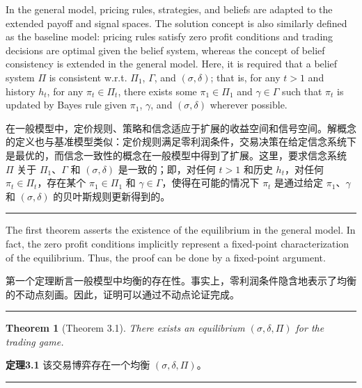 \documentclass[12pt,a4paper]{article}
\newenvironment{original}{%
  \par\vspace{4pt}\noindent%
  \color{black}%
  \ignorespaces
}{%
  \par\vspace{2pt}%
}
\newenvironment{translation}{%
  \par\vspace{2pt}\noindent%
  \color{transblue}%
  \ignorespaces
}{%
  \par\vspace{4pt}\hrule\vspace{6pt}%
}
\newtheorem{theorem}{Theorem}[section]
\begin{document}
\begin{original}
In the general model, pricing rules, strategies, and beliefs are adapted to the extended payoff and signal spaces. The solution concept is also similarly defined as the baseline model: pricing rules satisfy zero profit conditions and trading decisions are optimal given the belief system, whereas the concept of belief consistency is extended in the general model. Here, it is required that a belief system $\Pi$ is consistent w.r.t. $\Pi_1$, $\Gamma$, and $(\sigma, \delta)$; that is, for any $t > 1$ and history $h_t$, for any $\pi_t \in \Pi_t$, there exists some $\pi_1 \in \Pi_1$ and $\gamma \in \Gamma$ such that $\pi_t$ is updated by Bayes rule given $\pi_1$, $\gamma$, and $(\sigma, \delta)$ wherever possible.
\end{original}
\begin{translation}
在一般模型中，定价规则、策略和信念适应于扩展的收益空间和信号空间。解概念的定义也与基准模型类似：定价规则满足零利润条件，交易决策在给定信念系统下是最优的，而信念一致性的概念在一般模型中得到了扩展。这里，要求信念系统 $\Pi$ 关于 $\Pi_1$、$\Gamma$ 和 $(\sigma, \delta)$ 是一致的；即，对任何 $t > 1$ 和历史 $h_t$，对任何 $\pi_t \in \Pi_t$，存在某个 $\pi_1 \in \Pi_1$ 和 $\gamma \in \Gamma$，使得在可能的情况下 $\pi_t$ 是通过给定 $\pi_1$、$\gamma$ 和 $(\sigma, \delta)$ 的贝叶斯规则更新得到的。
\end{translation}

\begin{original}
The first theorem asserts the existence of the equilibrium in the general model. In fact, the zero profit conditions implicitly represent a fixed-point characterization of the equilibrium. Thus, the proof can be done by a fixed-point argument.
\end{original}
\begin{translation}
第一个定理断言一般模型中均衡的存在性。事实上，零利润条件隐含地表示了均衡的不动点刻画。因此，证明可以通过不动点论证完成。
\end{translation}

\begin{theorem}[Theorem 3.1]
There exists an equilibrium $(\sigma, \delta, \Pi)$ for the trading game.
\end{theorem}
\begin{translation}
\textbf{定理3.1} 该交易博弈存在一个均衡 $(\sigma, \delta, \Pi)$。
\end{translation}
\end{document}
